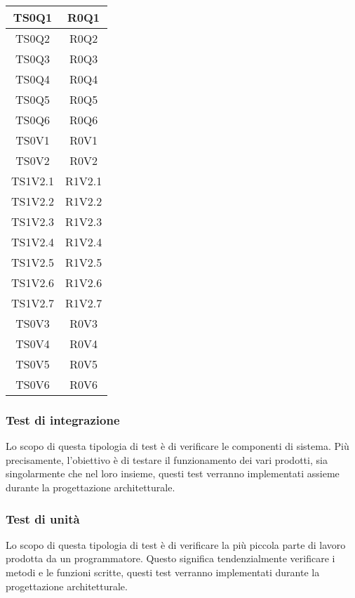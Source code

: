 \begin{longtable}{|c|c|}
    	TS0Q1&R0Q1 \\ \hline
    	TS0Q2&R0Q2 \\ \hline
    	TS0Q3&R0Q3 \\ \hline
    	TS0Q4&R0Q4 \\ \hline
    	TS0Q5&R0Q5 \\ \hline
    	TS0Q6&R0Q6 \\ \hline
    	
    	TS0V1&R0V1 \\ \hline
    	TS0V2&R0V2 \\ \hline
    	TS1V2.1&R1V2.1 \\ \hline
    	TS1V2.2&R1V2.2 \\ \hline
    	TS1V2.3&R1V2.3 \\ \hline
    	TS1V2.4&R1V2.4 \\ \hline
    	TS1V2.5&R1V2.5 \\ \hline
    	TS1V2.6&R1V2.6 \\ \hline
    	TS1V2.7&R1V2.7 \\ \hline
    	TS0V3&R0V3 \\ \hline
    	TS0V4&R0V4 \\ \hline
    	TS0V5&R0V5 \\ \hline
    	TS0V6&R0V6 \\ \hline
    \end{longtable}
	
	\subsubsection{Test di integrazione}
	Lo scopo di questa tipologia di test è di verificare le componenti di sistema. Più	precisamente, l’obiettivo è di testare il funzionamento dei vari  prodotti, sia singolarmente che nel loro insieme, questi test verranno implementati assieme durante la progettazione architetturale.
	
	\subsubsection{Test di unità}
	Lo scopo di questa tipologia di test è di verificare la più piccola parte di lavoro prodotta da un programmatore. Questo significa tendenzialmente verificare i metodi e le funzioni scritte, questi test verranno implementati durante la progettazione architetturale.
		
		
	
	
		

	
	
